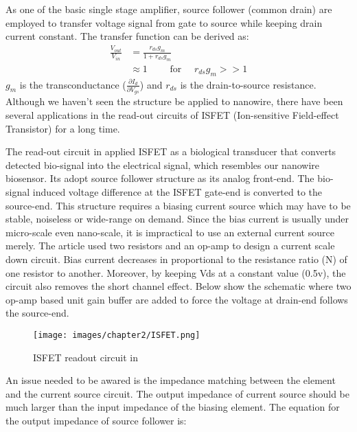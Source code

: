As one of the basic single stage amplifier, source follower (common drain) are employed to transfer voltage signal from gate to source while keeping drain current constant.
The transfer function can be derived as:
\setlength{\mathindent}{5.5cm}
\begin{align}
    \frac{V_{out}}{V_{in}} & = \frac{r_{ds}g_m}{1 + r_{ds}g_m} \\    \label{eq:sfTF}
                           & \approx 1 \qquad \text{ for } \quad r_{ds}g_m >> 1
\end{align}
$g_m$ is the transconductance ($\frac{\partial I_d}{\partial V_{gs}}$) and $r_{ds}$ is the drain-to-source resistance.
Although we haven't seen the structure be applied to nanowire, there have been several applications in the read-out circuits of ISFET (Ion-sensitive Field-effect Transistor)\cite{SF1, SF2} for a long time.



The read-out circuit in \cite{SF1} applied ISFET as a biological transducer that converts detected bio-signal into the electrical signal, which resembles our nanowire biosensor.
Its adopt source follower structure as its  analog front-end.
The bio-signal induced voltage difference at the ISFET gate-end is converted to the source-end.
This structure requires a biasing current source which may have to be stable, noiseless or wide-range on demand.
Since the bias current is usually under micro-scale even nano-scale, it is impractical to use an external current source merely.
The article used two resistors and an op-amp to design a current scale down circuit.
Bias current decreases in proportional to the resistance ratio (N) of one resistor to another.
Moreover, by keeping Vds at a constant value (0.5v), the circuit also removes the short channel effect.
Below show the schematic where two op-amp based unit gain buffer are added to force the voltage at drain-end follows the source-end.

\begin{figure}[h]
    \centering
    \texttt{[image: images/chapter2/ISFET.png]}
    \fontsize{6}{7}\selectfont
    \caption{ISFET readout circuit in \cite{SF1}}
    \label{fig:ISFET}
\end{figure}

An issue needed to be awared is the impedance matching between the element and the current source circuit.
The output impedance of current source should be much larger than the input impedance of the biasing element.
The equation for the output impedance of source follower is:


